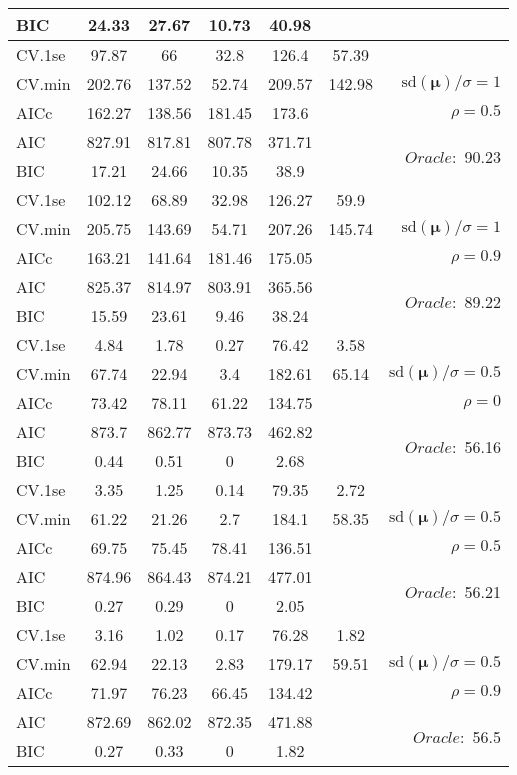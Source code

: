 \begin{table}
\begin{center}
\begin{tabular}{l*{5}{c}|r}
BIC & 24.33 & 27.67 & 10.73 & 40.98 & &  \\
 \hline 
CV.1se & 97.87 & 66 & 32.8 & 126.4 & 57.39 & \\
CV.min & 202.76 & 137.52 & 52.74 & 209.57 & 142.98 &  $\mathrm{sd}(\mathbf{\mu})/\sigma=1$ \\
AICc & 162.27 & 138.56 & 181.45 & 173.6 & & $\rho=0.5$ \\
AIC & 827.91 & 817.81 & 807.78 & 371.71 & &  \multirow{2}{*}{$Oracle: $ 90.23} \\
BIC & 17.21 & 24.66 & 10.35 & 38.9 & &  \\
 \hline 
CV.1se & 102.12 & 68.89 & 32.98 & 126.27 & 59.9 & \\
CV.min & 205.75 & 143.69 & 54.71 & 207.26 & 145.74 &  $\mathrm{sd}(\mathbf{\mu})/\sigma=1$ \\
AICc & 163.21 & 141.64 & 181.46 & 175.05 & & $\rho=0.9$ \\
AIC & 825.37 & 814.97 & 803.91 & 365.56 & &  \multirow{2}{*}{$Oracle: $ 89.22} \\
BIC & 15.59 & 23.61 & 9.46 & 38.24 & &  \\
 \hline 
CV.1se & 4.84 & 1.78 & 0.27 & 76.42 & 3.58 & \\
CV.min & 67.74 & 22.94 & 3.4 & 182.61 & 65.14 &  $\mathrm{sd}(\mathbf{\mu})/\sigma=0.5$ \\
AICc & 73.42 & 78.11 & 61.22 & 134.75 & & $\rho=0$ \\
AIC & 873.7 & 862.77 & 873.73 & 462.82 & &  \multirow{2}{*}{$Oracle: $ 56.16} \\
BIC & 0.44 & 0.51 & 0 & 2.68 & &  \\
 \hline 
CV.1se & 3.35 & 1.25 & 0.14 & 79.35 & 2.72 & \\
CV.min & 61.22 & 21.26 & 2.7 & 184.1 & 58.35 &  $\mathrm{sd}(\mathbf{\mu})/\sigma=0.5$ \\
AICc & 69.75 & 75.45 & 78.41 & 136.51 & & $\rho=0.5$ \\
AIC & 874.96 & 864.43 & 874.21 & 477.01 & &  \multirow{2}{*}{$Oracle: $ 56.21} \\
BIC & 0.27 & 0.29 & 0 & 2.05 & &  \\
 \hline 
CV.1se & 3.16 & 1.02 & 0.17 & 76.28 & 1.82 & \\
CV.min & 62.94 & 22.13 & 2.83 & 179.17 & 59.51 &  $\mathrm{sd}(\mathbf{\mu})/\sigma=0.5$ \\
AICc & 71.97 & 76.23 & 66.45 & 134.42 & & $\rho=0.9$ \\
AIC & 872.69 & 862.02 & 872.35 & 471.88 & &  \multirow{2}{*}{$Oracle: $ 56.5} \\
BIC & 0.27 & 0.33 & 0 & 1.82 & &  \\
 \hline 
\end{tabular}
\end{center}
\vspace{-1cm}
\end{table}





